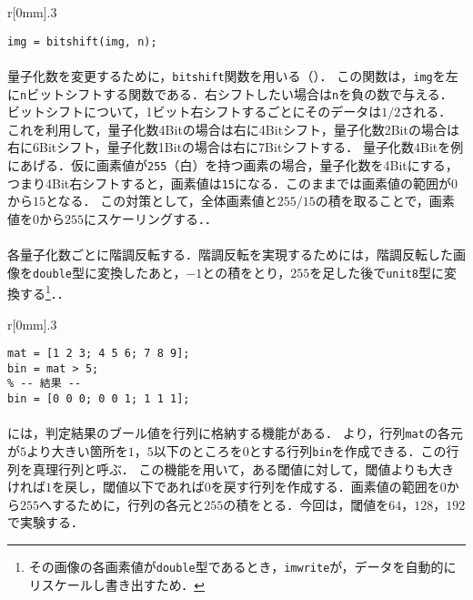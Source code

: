 \begin{wrapfigure}{r}[0mm]{.3\textwidth}
    \centering
    \vspace{-.7cm}
    \begin{lstlisting}[caption={\texttt{bitshift}関数},label={src:bitshift}]
img = bitshift(img, n);
    \end{lstlisting}
    \vspace{-.5cm}
\end{wrapfigure}
\paragraph{\kadaiab}
量子化数を変更するために，\texttt{bitshift}関数を用いる（）．
この関数は，\texttt{img}を左に\texttt{n}ビットシフトする関数である．右シフトしたい場合は\texttt{n}を負の数で与える．
ビットシフトについて，1ビット右シフトするごとにそのデータは\(1/2\)される．
これを利用して，量子化数4Bitの場合は右に4Bitシフト，量子化数2Bitの場合は右に6Bitシフト，量子化数1Bitの場合は右に7Bitシフトする．
量子化数4Bitを例にあげる．仮に画素値が\texttt{255}（白）を持つ画素の場合，量子化数を4Bitにする，つまり4Bit右シフトすると，画素値は\texttt{15}になる．このままでは画素値の範囲が\(0\)から\(15\)となる．
この対策として，全体画素値と\(255/15\)の積を取ることで，画素値を\(0\)から\(255\)にスケーリングする．\scall{\kadaiab}．
\paragraph{\kadaiac}
各量子化数ごとに階調反転する．階調反転を実現するためには，階調反転した画像を\texttt{double}型に変換したあと，\(-1\)との積をとり，\(255\)を足した後で\texttt{unit8}型に変換する\footnote{その画像の各画素値が\texttt{double}型であるとき，\texttt{imwrite}が，データを自動的にリスケールし書き出すため．}．\scall{\kadaiac}．

\begin{wrapfigure}{r}[0mm]{.3\textwidth}
    \centering
    \vspace{-.7cm}
    \begin{lstlisting}[caption={判定結果の格納},label={src:判定結果の格納}]
mat = [1 2 3; 4 5 6; 7 8 9];
bin = mat > 5;
% -- 結果 --
bin = [0 0 0; 0 0 1; 1 1 1];     
    \end{lstlisting}
    \vspace{-.5cm}
\end{wrapfigure}
\paragraph{\kadaiad}
\matlab には，判定結果のブール値を行列に格納する機能がある．
より，行列\texttt{mat}の各元が\(5\)より大きい箇所を\(1\)，\(5\)以下のところを\(0\)とする行列\texttt{bin}を作成できる．この行列を真理行列と呼ぶ．
この機能を用いて，ある閾値に対して，閾値よりも大きければ\(1\)を戻し，閾値以下であれば\(0\)を戻す行列を作成する．画素値の範囲を\(0\)から\(255\)へするために，行列の各元と\(255\)の積をとる．今回は，閾値を\(64\)，\(128\)，\(192\)で実験する．\scall{\kadaiad}

